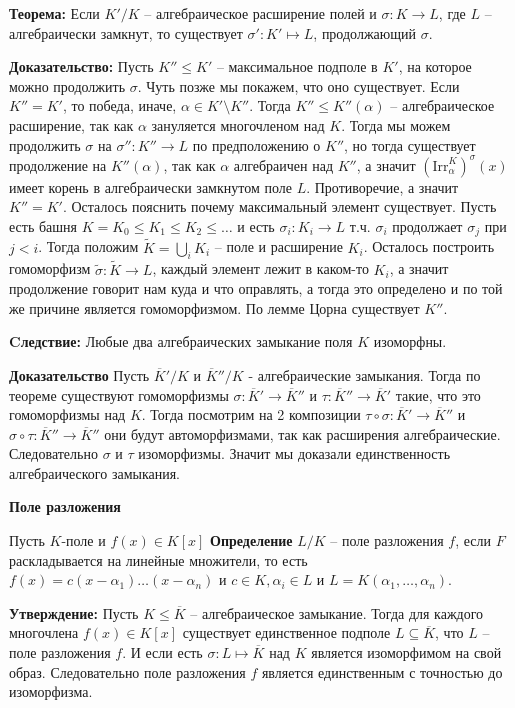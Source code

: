 \documentclass[a4paper, 12pt]{book}
\begin{document}
\textbf{Теорема:} Если $K'/K$ – алгебраическое расширение полей и $\sigma:K
\rightarrow L$, где $L$ – алгебраически замкнут, то существует $\sigma':K'
\mapsto L$, продолжающий $\sigma$.

\textbf{Доказательство:} Пусть $K''\le K'$ – максимальное подполе в $K'$, на
которое можно продолжить $\sigma$. Чуть позже мы покажем, что оно существует.
Если $K''=K'$, то победа, иначе, $\alpha\in K'\setminus K''$. Тогда $K''\le K''
(\alpha)$ – алгебраическое расширение, так как $\alpha$ зануляется многочленом
над $K$. Тогда мы можем продолжить $\sigma$ на $\sigma'':K''\rightarrow L$ по
предположению о $K''$, но тогда существует продолжение на $K''(\alpha)$, так
как $\alpha$ алгебраичен над $K''$, а значит $(\text{Irr}_\alpha^K)^\sigma(x)$
имеет корень в алгебраически замкнутом поле $L$. Противоречие, а значит
$K''=K'$. Осталось пояснить почему максимальный элемент существует. Пусть есть
башня $K=K_0\le K_1\le K_2\le\ldots$ и есть $\sigma_i:K_i\rightarrow L$ т.ч.
$\sigma_i$ продолжает $\sigma_j$ при $j<i$. Тогда положим $\widetilde{K}=\bigcup_i
K_i$ – поле и расширение $K_i$. Осталось построить гомоморфизм $\widetilde\sigma:
\widetilde K\rightarrow L$, каждый элемент лежит в каком-то $K_i$, а значит
продолжение говорит нам куда и что оправлять, а тогда это определено и по той
же причине является гомоморфизмом. По лемме Цорна существует $K''$.

\textbf{Cледствие:} Любые два алгебраических замыкание поля $K$ изоморфны.

\textbf{Доказательство} Пусть $\overline K'/K$ и $\overline K''/K$ -
алгебраические замыкания. Тогда по теореме существуют гомоморфизмы $\sigma:
\overline K'\rightarrow \overline K''$ и $\tau:\overline K''\rightarrow
\overline K'$ такие, что это гомоморфизмы над $K$. Тогда посмотрим на 2 композиции
$\tau\circ\sigma:\overline K'\rightarrow\overline K''$ и $\sigma\circ\tau:
\overline K''\rightarrow\overline K''$ они будут автоморфизмами, так как
расширения алгебраические. Следовательно $\sigma$ и $\tau$ изоморфизмы.
Значит мы доказали единственность алгебраического замыкания.

\textbf{Поле разложения}

Пусть $K$-поле и $f(x)\in K[x]$
\textbf{Определение} $L/K$ – поле разложения $f$, если $F$ раскладывается на
линейные множители, то есть $f(x)=c(x-\alpha_1)\ldots(x-\alpha_n)$ и $c\in K,
\alpha_i\in L$ и $L=K(\alpha_1,\ldots,\alpha_n)$.

\textbf{Утверждение:} Пусть $K\le\overline K$ – алгебраическое замыкание. Тогда
для каждого многочлена $f(x)\in K[x]$ существует единственное подполе
$L\subseteq\overline K$, что $L$ – поле разложения $f$. И если есть $\sigma: L
\mapsto\overline K$ над $K$ является изоморфимом на свой образ. Следовательно
поле разложения $f$ является единственным с точностью до изоморфизма.
\end{document}
